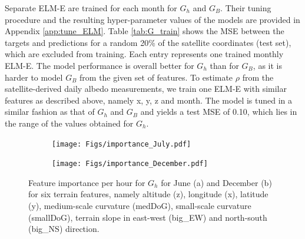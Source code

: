 Separate ELM-E are trained for each month for $G_h$ and $G_B$. %
Their tuning procedure and the resulting hyper-parameter values of the models are provided in Appendix \ref{app:tune_ELM}. 
Table \ref{tab:G_train} shows the MSE between the targets and predictions for a random 20\% of the satellite coordinates (test set), which are excluded from training.
Each entry represents one trained monthly ELM-E.
The model performance is overall better for $G_h$ than for $G_B$, as it is harder to model $G_B$ from the given set of features.
% 
To estimate $\rho$ from the satellite-derived daily albedo measurements, we train one ELM-E with similar features as described above, namely x, y, z and month. The model is tuned in a similar fashion as that of $G_h$ and $G_B$ and yields a test MSE of 0.10, which lies in the range of the values obtained for $G_h$.

\begin{figure}[tb]
\centering
\begin{subfigure}{.4\textwidth}
  \centering
  \texttt{[image: Figs/importance\_July.pdf]}  
\end{subfigure}
\begin{subfigure}{.4\textwidth}
  \centering
  \texttt{[image: Figs/importance\_December.pdf]}  
\end{subfigure}
\caption{Feature importance per hour for $G_h$ for June (a) and December (b) for six terrain features, namely altitude (z), longitude (x), latitude (y), medium-scale curvature (medDoG), small-scale curvature (smallDoG), terrain slope in east-west (big\_EW) and north-south (big\_NS) direction.} %
\label{fig:ftrs_phys}
\end{figure}


